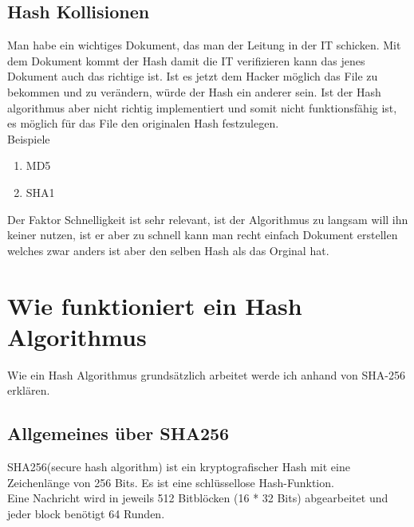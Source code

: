 {\subsection{Hash Kollisionen}
\label{sec:hash_coll}
Man habe ein wichtiges Dokument, das man der Leitung in der IT schicken. Mit dem Dokument kommt der Hash damit die IT verifizieren kann das jenes Dokument auch das richtige ist. Ist es jetzt dem Hacker möglich das File zu bekommen und zu verändern, würde der Hash ein anderer sein. Ist der Hash algorithmus aber nicht richtig implementiert und somit nicht funktionsfähig ist, es möglich für das File den originalen Hash festzulegen.
\\
Beispiele
\begin{enumerate}
\item MD5
\item SHA1
\end{enumerate}
Der Faktor Schnelligkeit ist sehr relevant, ist der Algorithmus zu langsam will ihn keiner nutzen, ist er aber zu schnell kann man recht einfach Dokument erstellen welches zwar anders ist aber den selben Hash als das Orginal hat.
\section{Wie funktioniert ein Hash Algorithmus}
\label{sec:hash_algo}
Wie ein Hash Algorithmus grundsätzlich arbeitet werde ich anhand von SHA-256 erklären. 
\subsection{Allgemeines über SHA256}
\label{sec:hash_sha}
SHA256(secure hash algorithm) ist ein kryptografischer Hash mit eine Zeichenlänge von 256 Bits. Es ist eine schlüssellose Hash-Funktion.
\\
Eine Nachricht wird in jeweils 512 Bitblöcken (16 * 32 Bits) abgearbeitet und jeder block benötigt 64 Runden.
}
